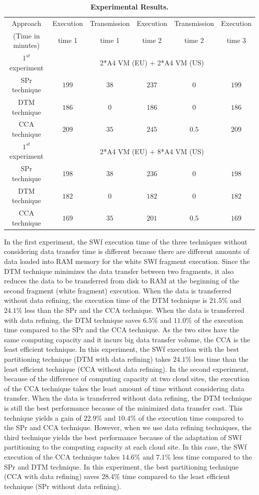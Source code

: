 \begin{table}
\caption{\textbf{Experimental Results.}}
\label{tab:sim-1}
\begin{centering}
\begin{tabular}{|c|c|c|c|c|c|}
\hline 
Approach & Execution & Transmission & Execution & Transmission & Execution \tabularnewline
(Time in minutes) & time 1 & time 1 & time 2 & time 2 & time 3 \tabularnewline

\hline 
$1^{st}$ experiment & \multicolumn{5}{c|}{2*A4 VM (EU) + 2*A4 VM (US)} \tabularnewline
\hline
SPr technique & $199$ & $38$ & $237$ & $0$ & $199$ \tabularnewline
DTM technique & $186$ & $0$ & $186$ & $0$ & $186$ \tabularnewline
CCA technique & $209$ & $35$ & $245$ & $0.5$ & $209$ \tabularnewline
\hline 
$1^{st}$ experiment & \multicolumn{5}{c|}{2*A4 VM (EU) + 8*A4 VM (US)} \tabularnewline
\hline
SPr technique & $198$ & $38$ & $236$ & $0$ & $198$ \tabularnewline
DTM technique & $182$ & $0$ & $182$ & $0$ & $182$ \tabularnewline
CCA technique & $169$ & $35$ & $201$ & $0.5$ & $169$ \tabularnewline
\hline 
\end{tabular}
\par\end{centering}
\end{table}

In the first experiment, the SWf execution time of the three techniques without considering data transfer time is different 
because there are different amounts of data loaded into RAM memory for the white SWf fragment execution. 
Since the DTM technique minimizes the data transfer between two fragments, 
it also reduces the data to be transferred from disk to RAM at the beginning of the second fragment (white fragment) execution.
When the data is transferred without data refining, the execution time of the DTM technique is $21.5\%$ and $24.1\%$ less than the SPr and the CCA technique.
When the data is transferred with data refining, the DTM technique saves $6.5\%$ and $11.0\%$ of the execution time compared to the SPr and the CCA technique.
As the two sites have the same computing capacity and it incurs big data transfer volume, the CCA is the least efficient technique.
In this experiment, the SWf execution with the best partitioning technique (DTM with data refining) takes $24.1\%$ less time than the least efficient technique (CCA without data refining).
In the second experiment, because of the difference of computing capacity at two cloud sites, 
the execution of the CCA technique takes the least amount of time without considering data transfer. 
When the data is transferred without data refining, 
the DTM technique is still the best performance because of the minimized data transfer cost. 
This technique yields a gain of $22.9\%$ and $10.4\%$ of the execution time compared to the SPr and CCA technique.
However, when we use data refining techniques, 
the third technique yields the best performance because of the adaptation of SWf partitioning to the computing capacity at each cloud site.
In this case, the SWf execution of the CCA technique takes $14.6\%$ and $7.1\%$ less time compared to the SPr and DTM technique.
In this experiment, the best partitioning technique (CCA with data refining) saves $28.4\%$ time compared to the least efficient technique (SPr without data refining).

